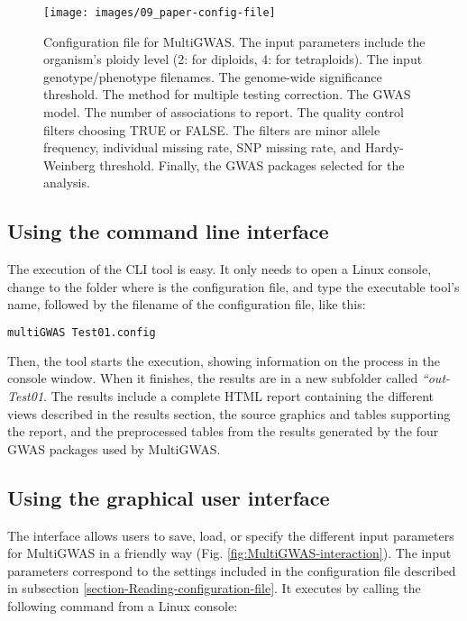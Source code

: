 \documentclass{article}
\begin{document}
\begin{figure}[H]
\begin{centering}
\texttt{[image: images/09\_paper-config-file]}
\par\end{centering}
\caption{Configuration file for MultiGWAS. The input parameters include the organism's ploidy level (2: for diploids, 4: for tetraploids). The input genotype/phenotype filenames. The genome-wide significance threshold. The method for multiple testing correction. The GWAS model. The number of associations to report. The quality control filters choosing TRUE or FALSE. The filters are minor allele frequency, individual missing rate, SNP missing rate, and Hardy-Weinberg threshold. Finally, the GWAS packages selected for the analysis.
\label{fig:Configuration-file}}
\end{figure}

\subsection{Using the command line interface}
The execution of the CLI tool is easy. It only needs to open a Linux console, change to the folder where is the configuration file, and type the executable tool's name, followed by the filename of the configuration file, like this:

\begin{lstlisting}[language=bash,basicstyle={\small}]
multiGWAS Test01.config
\end{lstlisting}

Then, the tool starts the execution, showing information on the process in the console window. When it finishes, the results are in a new subfolder called \emph{``out-Test01}.  The results include a complete HTML report containing the different views described in the results section, the source graphics and tables supporting the report, and the preprocessed tables from the results generated by the four GWAS packages used by MultiGWAS.


\subsection{Using the graphical user interface}
The interface allows users to save, load, or specify the different input parameters for MultiGWAS in a friendly way (Fig. \ref{fig:MultiGWAS-interaction}). The input parameters correspond to the settings included in the configuration file described in subsection \ref{section-Reading-configuration-file}. It executes by calling the following command from a Linux console:
\end{document}
